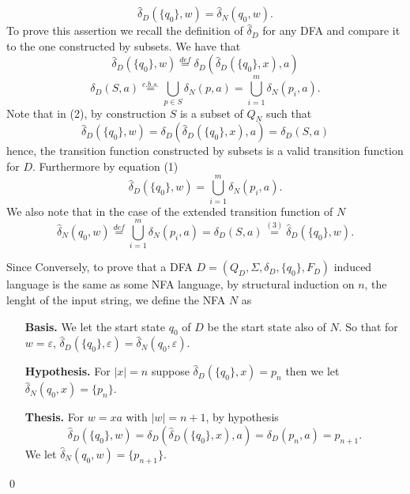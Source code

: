\documentclass{article}
\newcommand{\D}{
    \hat{\delta}_{D}
}
\newcommand{\DD}[2]{
    \hat{\delta}_{D}(\{#1\}, #2)
}
\newcommand{\NN}[2]{
    \hat{\delta}_{N}(#1, #2)
}
\theoremstyle{remark}
\begin{document}
\begin{enumerate}
\begin{enumerate}
        \[
        \DD{q_0}{w} = \NN{q_0}{w}.
        \]
        To prove this assertion we recall the definition of $\D$ for any DFA and compare it to the one constructed by subsets.
        We have that 
        \begin{equation}
            \DD{q_0}{w} \stackrel{def}{=} \delta_D(\DD{q_0}{x},a)
        \end{equation}
        \begin{equation}
            \delta_D(S,a) \stackrel{c.b.s.}{=} \bigcup_{p \in S}\delta_N(p,a) = \bigcup_{i=1}^{m}\delta_N(p_i,a).
        \end{equation}
        Note that in (2), by construction $S$ is a subset of $Q_N$ such that
        \begin{equation}
            \DD{q_0}{w} = \delta_D(\DD{q_0}{x},a) = \delta_D(S,a)
        \end{equation}
        hence, the transition function constructed by subsets is a valid transition function for $D$.
        Furthermore by equation (1)
        \[
        \DD{q_0}{w} = \bigcup_{i=1}^{m}\delta_N(p_i,a).
        \]
        We also note that in the case of the extended transition function of $N$ 
        \[
        \NN{q_0}{w} \stackrel{def}{=} \bigcup_{i=1}^{m}\delta_N(p_i,a) = \delta_D(S,a) \stackrel{(3)}{=} \DD{q_0}{w}.
        \]
    \end{enumerate}
    Since 
    Conversely, to prove that a DFA $D = (Q_D, \Sigma, \delta_D, \{q_0\}, F_D)$ induced language is the same as some NFA language, 
    by structural induction on $n$, the lenght of the input string, we define the NFA $N$ as 
    \begin{enumerate}
        \item[\textbf{Basis.}]
        We let the start state $q_0$ of $D$ be the start state also of $N$. 
        So that for $w = \varepsilon$, $\DD{q_0}{\varepsilon} = \NN{q_0}{\varepsilon}$.
        \item[\textbf{Hypothesis.}]
        For $\vert x \vert = n$ suppose $\DD{q_0}{x} = p_n$ then we let $\NN{q_0}{x} = \{p_n\}$.
        \item[\textbf{Thesis.}]
        For $w = xa$ with $\vert w \vert = n+1$, by hypothesis 
        \[
        \DD{q_0}{w} = \delta_D(\DD{q_0}{x},a) = \delta_D(p_n,a) = p_{n+1}.
        \]
        We let $\NN{q_0}{w} = \{p_{n+1}\}$.
    \end{enumerate}
    \begin{flushright}
        \qed
    \end{flushright}


\end{enumerate}
\end{document}
